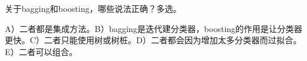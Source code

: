 关于bagging和boosting，哪些说法正确？多选。


A）二者都是集成方法。B）bagging是迭代建分类器，boosting的作用是让分类器更快。C）二者只能使用树或树桩。D）二者都会因为增加太多分类器而过拟合。E）二者可以组合。
